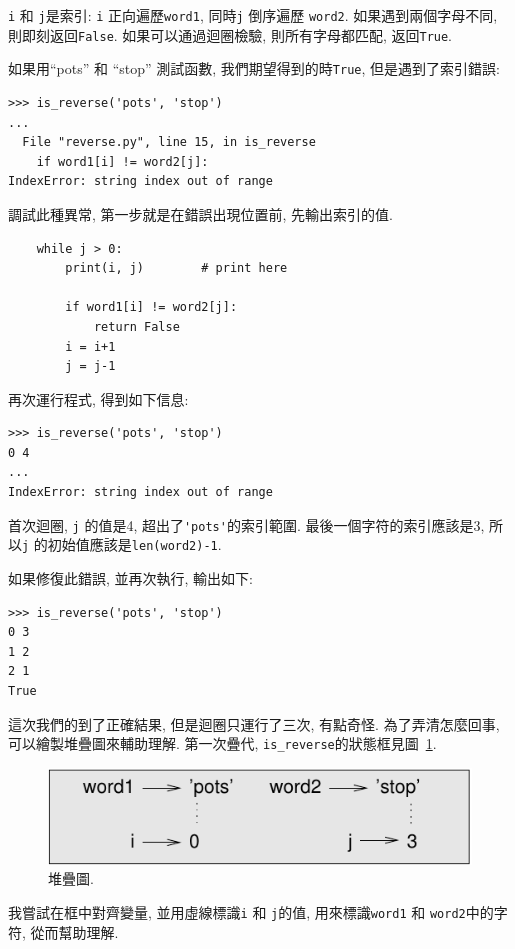 \documentclass[10pt]{book}
\begin{document}
{\tt i} 和 {\tt j}是索引: {\tt i} 正向遍歷{\tt word1}, 同時{\tt j} 倒序遍歷
{\tt word2}. 如果遇到兩個字母不同, 則即刻返回{\tt False}. 
如果可以通過迴圈檢驗, 則所有字母都匹配, 返回{\tt True}. 

如果用``pots'' 和 ``stop'' 測試函數, 我們期望得到的時{\tt True}, 
但是遇到了索引錯誤:

\begin{verbatim}
>>> is_reverse('pots', 'stop')
...
  File "reverse.py", line 15, in is_reverse
    if word1[i] != word2[j]:
IndexError: string index out of range
\end{verbatim}
%
調試此種異常, 第一步就是在錯誤出現位置前, 先輸出索引的值. 

\begin{verbatim}
    while j > 0:
        print(i, j)        # print here
        
        if word1[i] != word2[j]:
            return False
        i = i+1
        j = j-1
\end{verbatim}
%
再次運行程式, 得到如下信息:

\begin{verbatim}
>>> is_reverse('pots', 'stop')
0 4
...
IndexError: string index out of range
\end{verbatim}
%
首次迴圈,  {\tt j} 的值是4,
超出了\verb"'pots'"的索引範圍. 
最後一個字符的索引應該是3,
所以{\tt j} 的初始值應該是{\tt len(word2)-1}.

如果修復此錯誤, 並再次執行, 輸出如下:

\begin{verbatim}
>>> is_reverse('pots', 'stop')
0 3
1 2
2 1
True
\end{verbatim}
%
這次我們的到了正確結果, 但是迴圈只運行了三次, 有點奇怪. 
為了弄清怎麼回事, 可以繪製堆疊圖來輔助理解. 
第一次疊代, \verb"is_reverse"的狀態框見圖~\ref{fig.state4}.  
 

\begin{figure}
\centerline
{\includegraphics[scale=0.8]{figs/state4.pdf}}
\caption{堆疊圖.}
\label{fig.state4}
\end{figure}

我嘗試在框中對齊變量, 並用虛線標識{\tt i} 和
{\tt j}的值, 用來標識{\tt word1} 和 {\tt word2}中的字符, 
從而幫助理解. 
\end{document}
